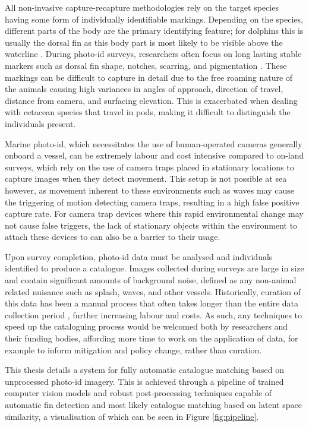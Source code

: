 All non-invasive capture-recapture methodologies rely on the target species having some form of individually identifiable markings. Depending on the species, different parts of the body are the primary identifying feature; for dolphins this is usually the dorsal fin as this body part is most likely to be visible above the waterline \cite{sharpe_indian_2019, baird_population_2009}. During photo-id surveys, researchers often focus on long lasting stable markers such as dorsal fin shape, notches, scarring, and pigmentation \cite{wursig_photographic_1977, lockyer_observations_1990, mann_cetacean_2000}. These markings can be difficult to capture in detail due to the free roaming nature of the animals causing high variances in angles of approach, direction of travel, distance from camera, and surfacing elevation. This is exacerbated when dealing with cetacean species that travel in pods, making it difficult to distinguish the individuals present.

Marine photo-id, which necessitates the use of human-operated cameras generally onboard a vessel, can be extremely labour and cost intensive compared to on-land surveys, which rely on the use of camera traps placed in stationary locations to capture images when they detect movement. This setup is not possible at sea however, as movement inherent to these environments such as waves may cause the triggering of motion detecting camera traps, resulting in a high false positive capture rate. For camera trap devices where this rapid environmental change may not cause false triggers, the lack of stationary objects within the environment to attach these devices to can also be a barrier to their usage. 

Upon survey completion, photo-id data must be analysed and individuals identified to produce a catalogue. Images collected during surveys are large in size and contain significant amounts of background noise, defined as any non-animal related nuisance such as splash, waves, and other vessels. Historically, curation of this data has been a manual process that often takes longer than the entire data collection period \cite{tyson_moore_rise_2022}, further increasing labour and costs. As such, any techniques to speed up the cataloguing process would be welcomed both by researchers and their funding bodies, affording more time to work on the application of data, for example to inform mitigation and policy change, rather than curation. 

This thesis details a system for fully automatic catalogue matching based on unprocessed photo-id imagery. This is achieved through a pipeline of trained computer vision models and robust post-processing techniques capable of automatic fin detection and most likely catalogue matching based on latent space similarity, a visualisation of which can be seen in Figure \ref{fig:pipeline}. 

